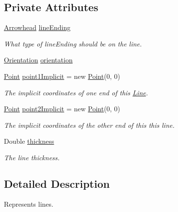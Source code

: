 \subsection*{Private Attributes}
\begin{DoxyCompactItemize}
\item 
\hyperlink{classcom_1_1aarrelaakso_1_1drawl_1_1_arrowhead}{Arrowhead} \hyperlink{classcom_1_1aarrelaakso_1_1drawl_1_1_line_a6a82ee992a758049f71dfbb22c597149}{lineEnding}
\begin{DoxyCompactList}\small\item\em What type of lineEnding should be on the line. \end{DoxyCompactList}\item
\hyperlink{enumcom_1_1aarrelaakso_1_1drawl_1_1_line_1_1_orientation}{Orientation} \hyperlink{classcom_1_1aarrelaakso_1_1drawl_1_1_line_a441ce546831b219e01f5fd0f7e0bb3b1}{orientation}
\item 
\hyperlink{classcom_1_1aarrelaakso_1_1drawl_1_1_point}{Point} \hyperlink{classcom_1_1aarrelaakso_1_1drawl_1_1_line_a48220286707ae05387f9c99d9e08784c}{point1\+Implicit} = new \hyperlink{classcom_1_1aarrelaakso_1_1drawl_1_1_point}{Point}(0, 0)
\begin{DoxyCompactList}\small\item\em The implicit coordinates of one end of this \hyperlink{classcom_1_1aarrelaakso_1_1drawl_1_1_line}{Line}. \end{DoxyCompactList}\item 
\hyperlink{classcom_1_1aarrelaakso_1_1drawl_1_1_point}{Point} \hyperlink{classcom_1_1aarrelaakso_1_1drawl_1_1_line_a055d1e743c66cc808f108664b38d7de2}{point2\+Implicit} = new \hyperlink{classcom_1_1aarrelaakso_1_1drawl_1_1_point}{Point}(0, 0)
\begin{DoxyCompactList}\small\item\em The implicit coordinates of the other end of this this line. \end{DoxyCompactList}\item 
Double \hyperlink{classcom_1_1aarrelaakso_1_1drawl_1_1_line_a314ae0371f5665cf70ad99742d44934a}{thickness}
\begin{DoxyCompactList}\small\item\em The line thickness. \end{DoxyCompactList}\end{DoxyCompactItemize}


\subsection{Detailed Description}
Represents lines. 

